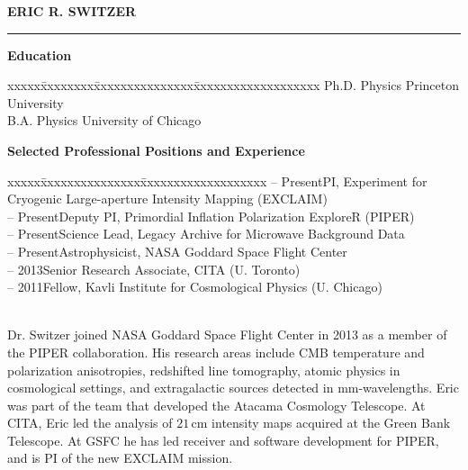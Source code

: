 \documentclass[12pt]{article}
\begin{document}
\vspace{-3mm}
\noindent
\begin{tabbing}
{\bf ERIC R. SWITZER} \\
\end{tabbing}
\vspace{-7mm}
\hrule height 0.7pt

\vspace{5mm}
\addressminimal{\lastupdated}

\small{
\noindent
{\bf Education}
\vspace{-3mm}
\begin{tabbing}
xxxxx\=xxxxxxxx\=xxxxxxxxxxxxxxx\=xxxxxxxxxxxxxxxxxxx\kill
{} \> Ph.D. Physics \> Princeton University \\
 \> B.A. Physics \> University of Chicago \\
\end{tabbing}}

\vspace{-5mm}
\small{
\noindent
{\bf Selected Professional Positions and Experience}
\vspace{-3mm}
\begin{tabbing}
xxxxx\=xxxxxxxxxxxxxxx\=xxxxxxxxxxxxxxxxxxx\kill
{} -- Present\>PI, Experiment for Cryogenic Large-aperture Intensity Mapping (EXCLAIM) \\
 -- Present\>Deputy PI, Primordial Inflation Polarization ExploreR (PIPER) \\
 -- Present\>Science Lead, Legacy Archive for Microwave Background Data \\
 -- Present\>Astrophysicist, NASA Goddard Space Flight Center \\
 -- 2013\>Senior Research Associate, CITA (U. Toronto) \\
 -- 2011\>Fellow, Kavli Institute for Cosmological Physics (U. Chicago) \\
\end{tabbing}}

\vspace{-2mm} \small{ \\ Dr. Switzer joined
NASA Goddard Space Flight Center in 2013 as a member of the PIPER
collaboration. His research areas include CMB temperature and polarization
anisotropies, redshifted line tomography, atomic physics in cosmological
settings, and extragalactic sources detected in mm-wavelengths. Eric was part
of the team that developed the Atacama Cosmology Telescope. At CITA, Eric led
the analysis of $21$\,cm intensity maps acquired at the Green Bank Telescope.
At GSFC he has led receiver and software development for PIPER, and is PI of
the new EXCLAIM mission.}
\end{document}
